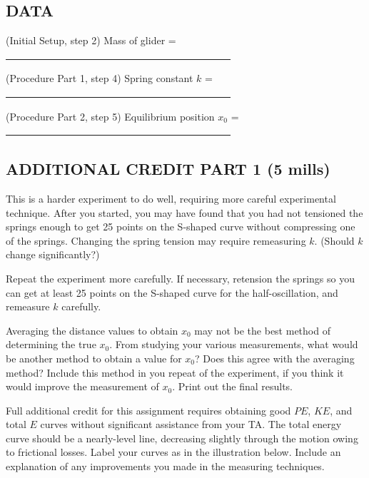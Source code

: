 \subsection*{DATA}

\vphantom{.}
\squishlist

\item (Initial Setup, step 2) Mass of glider = \ul{~~~~~~~~~~~~~~~~~~~~~~~~~~~~~~~~~~~~~~~~~~~~~}

\item (Procedure Part 1, step 4) Spring constant \(k\) = \ul{~~~~~~~~~~~~~~~~~~~~~~~~~~~~~~~~~~~~~~~~~~~~~}

\item (Procedure Part 2, step 5) Equilibrium position \(x_0\) = \ul{~~~~~~~~~~~~~~~~~~~~~~~~~~~~~~~~~~~~~~~~~~~~~}

\squishend

\subsection*{ADDITIONAL CREDIT PART 1 (5 mills)}

This is a harder experiment to do well, requiring more careful experimental technique.  After you started, you may have found that you had not tensioned the springs enough to get 25 points on the S-shaped curve without compressing one of the springs.  Changing the spring tension may require remeasuring \(k\).  (Should \(k\) change significantly?)

Repeat the experiment more carefully.  If necessary, retension the springs so you can get at least 25 points on the S-shaped curve for the half-oscillation, and remeasure \(k\) carefully.

Averaging the distance values to obtain \(x_0\) may not be the best method of determining the true \(x_0\).  From studying your various measurements, what would be another method to obtain a value for \(x_0\)?  Does this agree with the averaging method?  Include this method in you repeat of the experiment, if you think it would improve the measurement of \(x_0\).  Print out the final results.

Full additional credit for this assignment requires obtaining good \(PE\), \(KE\), and total \(E\) curves without significant assistance from your TA.  The total energy curve should be a nearly-level line, decreasing slightly through the motion owing to frictional losses.  Label your curves as in the illustration below.  Include an explanation of any improvements you made in the measuring techniques.

